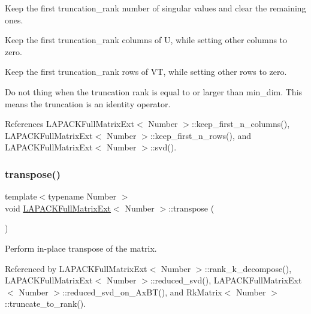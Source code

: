Keep the first {\ttfamily truncation\+\_\+rank} number of singular values and clear the remaining ones.

Keep the first {\ttfamily truncation\+\_\+rank} columns of {\ttfamily U}, while setting other columns to zero.

Keep the first {\ttfamily truncation\+\_\+rank} rows of {\ttfamily VT}, while setting other rows to zero.

Do not thing when the truncation rank is equal to or larger than {\ttfamily min\+\_\+dim}. This means the truncation is an identity operator.

References L\+A\+P\+A\+C\+K\+Full\+Matrix\+Ext$<$ Number $>$\+::keep\+\_\+first\+\_\+n\+\_\+columns(), L\+A\+P\+A\+C\+K\+Full\+Matrix\+Ext$<$ Number $>$\+::keep\+\_\+first\+\_\+n\+\_\+rows(), and L\+A\+P\+A\+C\+K\+Full\+Matrix\+Ext$<$ Number $>$\+::svd().

\mbox{\label{classLAPACKFullMatrixExt_ac46d71bc1b0288fce7ad44b222e9210b}} 
\subsubsection{\texorpdfstring{transpose()}{transpose()}\hspace{0.1cm}{\footnotesize\ttfamily [1/2]}}
{\footnotesize\ttfamily template$<$typename Number $>$ \\
void \hyperlink{classLAPACKFullMatrixExt}{L\+A\+P\+A\+C\+K\+Full\+Matrix\+Ext}$<$ Number $>$\+::transpose (\begin{DoxyParamCaption}{ }\end{DoxyParamCaption})}

Perform in-\/place transpose of the matrix. 

Referenced by L\+A\+P\+A\+C\+K\+Full\+Matrix\+Ext$<$ Number $>$\+::rank\+\_\+k\+\_\+decompose(), L\+A\+P\+A\+C\+K\+Full\+Matrix\+Ext$<$ Number $>$\+::reduced\+\_\+svd(), L\+A\+P\+A\+C\+K\+Full\+Matrix\+Ext$<$ Number $>$\+::reduced\+\_\+svd\+\_\+on\+\_\+\+Ax\+B\+T(), and Rk\+Matrix$<$ Number $>$\+::truncate\+\_\+to\+\_\+rank().

\mbox{\label{classLAPACKFullMatrixExt_a12a95aeff6e93f0284c59cffd0fb7b8e}} 
